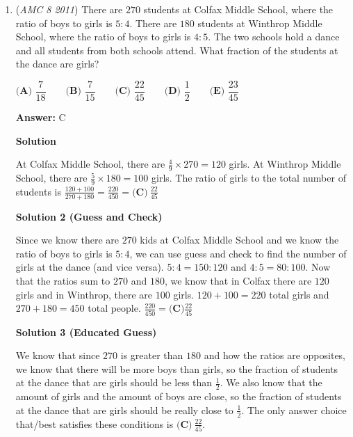 \begin{enumerate}
 



\textbf{Solution 3(similar to Solution 2)}

To find the overlap length, we do the total length of the squares and subtract $25$(side length of figure). $(15 + 15) - 25 = 5$, so the overlap length is $5$. To find what percentage of $AQRD$ is shaded, we divide the shaded part by the area of the $AQRD$, so the percentage is $\dfrac{15 \cdot 5}{15 \cdot 25}$ = $\dfrac{5}{25}$ = $\dfrac{1}{5}$ = $\dfrac{20}{100}$ = $20$\%, so the answer is $\boxed{ \textbf{(C)}\ \text{20} }$.

 


	\item (\textit{AMC 8 2011}) There are $270$ students at Colfax Middle School, where the ratio of boys to girls is $5 : 4$. There are $180$ students at Winthrop Middle School, where the ratio of boys to girls is $4 : 5$. The two schools hold a dance and all students from both schools attend. What fraction of the students at the dance are girls?


 $\textbf{(A) } \dfrac7{18} \qquad\textbf{(B) } \dfrac7{15} \qquad\textbf{(C) } \dfrac{22}{45} \qquad\textbf{(D) } \dfrac12 \qquad\textbf{(E) } \dfrac{23}{45}$

 \textbf{Answer: }C



\textbf{Solution}

At Colfax Middle School, there are $\frac49 \times 270 = 120$ girls. At Winthrop Middle School, there are $\frac59 \times 180 = 100$ girls. The ratio of girls to the total number of students is $\frac{120+100}{270+180} = \frac{220}{450} = \boxed{\textbf{(C)}\ \frac{22}{45}}$




\textbf{Solution 2 (Guess and Check)}

Since we know there are $270$ kids at Colfax Middle School and we know the ratio of boys to girls is $5:4$, we can use guess and check to find the number of girls at the dance (and vice versa). $5:4=150:120$ and $4:5=80:100$. Now that the ratios sum to $270$ and $180$, we know that in Colfax there are $120$ girls and in Winthrop, there are $100$ girls. $120+100=220$ total girls and $270+180=450$ total people. $\frac{220}{450}=\boxed{\textbf{(C)} \frac{22}{45}}$




\textbf{Solution 3 (Educated Guess)}

We know that since $270$ is greater than $180$ and how the ratios are opposites, we know that there will be more boys than girls, so the fraction of students at the dance that are girls should be less than $\frac{1}{2}$. We also know that the amount of girls and the amount of boys are close, so the fraction of students at the dance that are girls should be really close to $\frac{1}{2}$. The only answer choice that/best satisfies these conditions is $\boxed{\textbf{(C)}\ \frac{22}{45}}$.


\end{enumerate}
